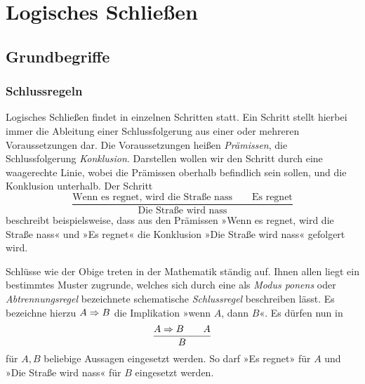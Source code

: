 
\chapter{Logisches Schließen}

\section{Grundbegriffe}

\subsection{Schlussregeln}





Logisches Schließen findet in einzelnen Schritten statt. Ein Schritt
stellt hierbei immer die Ableitung einer Schlussfolgerung aus einer
oder mehreren Voraussetzungen dar. Die Voraussetzungen heißen
\emph{Prämissen}, die Schlussfolgerung
\emph{Konklusion}. Darstellen wollen wir den Schritt
durch eine waagerechte Linie, wobei die Prämissen oberhalb befindlich
sein sollen, und die Konklusion unterhalb. Der Schritt
\[\dfrac{\text{Wenn es regnet, wird die Straße nass}\qquad\text{Es regnet}}
{\text{Die Straße wird nass}}\]
beschreibt beispielsweise, dass aus den Prämissen »Wenn es regnet, wird
die Straße nass« und »Es regnet« die Konklusion »Die Straße wird nass«
gefolgert wird.

Schlüsse wie der Obige treten in der Mathematik ständig auf. Ihnen allen
liegt ein bestimmtes Muster zugrunde, welches sich durch eine als
\emph{Modus ponens} oder
\emph{Abtrennungsregel}
bezeichnete schematische \emph{Schlussregel}
beschreiben lässt. Es bezeichne hierzu $A\Rightarrow B$ die Implikation
»wenn $A$, dann $B$«. Es dürfen nun in
\[\dfrac{A\Rightarrow B\qquad A}{B}\]
für $A,B$ beliebige Aussagen eingesetzt werden. So darf »Es regnet»
für $A$ und »Die Straße wird nass« für $B$ eingesetzt werden.

